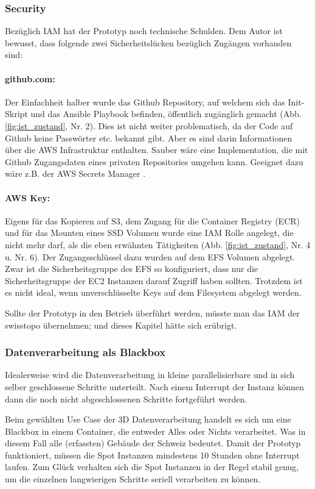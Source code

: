 \subsubsection{Security}
Bezüglich IAM hat der Prototyp noch technische Schulden. Dem Autor ist bewusst, dass folgende zwei Sicherheitslücken bezüglich Zugängen vorhanden sind:
\paragraph{github.com:} Der Einfachheit halber wurde das Github Repository, auf welchem sich das Init-Skript und das Ansible Playbook befinden, öffentlich zugänglich gemacht (Abb. \ref{fig:ist_zustand}, Nr. 2). Dies ist nicht weiter problematisch, da der Code auf Github keine Passwörter etc. bekannt gibt. Aber es sind darin Informationen über die AWS Infrastruktur enthalten. Sauber wäre eine Implementation, die mit Github Zugangsdaten eines privaten Repositories umgehen kann. Geeignet dazu wäre z.B. der AWS Secrets Manager \cite{Secrets2020}.
\paragraph{AWS Key:} Eigens für das Kopieren auf S3, dem Zugang für die Container Registry (ECR) und für das Mounten eines SSD Volumen wurde eine IAM Rolle angelegt, die nicht mehr darf, als die eben erwähnten Tätigkeiten (Abb. \ref{fig:ist_zustand}, Nr. 4 u. Nr. 6). Der Zugangsschlüssel dazu wurden auf dem EFS Volumen abgelegt. Zwar ist die Sicherheitsgruppe des EFS so konfiguriert, dass nur die Sicherheitsgruppe der EC2 Instanzen darauf Zugriff haben sollten. Trotzdem ist es nicht ideal, wenn unverschlüsselte Keys auf dem Filesystem abgelegt werden.

Sollte der Prototyp in den Betrieb überführt werden, müsste man das IAM der swisstopo übernehmen; und dieses Kapitel hätte sich erübrigt.

\subsubsection{Datenverarbeitung als Blackbox}
Idealerweise wird die Datenverarbeitung in kleine parallelisierbare und in sich selber geschlossene Schritte unterteilt. Nach einem Interrupt der Instanz können dann die noch nicht abgeschlossenen Schritte fortgeführt werden. 

Beim gewählten Use Case der 3D Datenverarbeitung handelt es sich um eine Blackbox in einem Container, die entweder Alles oder Nichts verarbeitet. Was in diesem Fall alle (erfassten) Gebäude der Schweiz bedeutet. Damit der Prototyp funktioniert, müssen die Spot Instanzen mindestens 10 Stunden ohne Interrupt laufen. Zum Glück verhalten sich die Spot Instanzen in der Regel stabil genug, um die einzelnen langwierigen Schritte seriell verarbeiten zu können.

